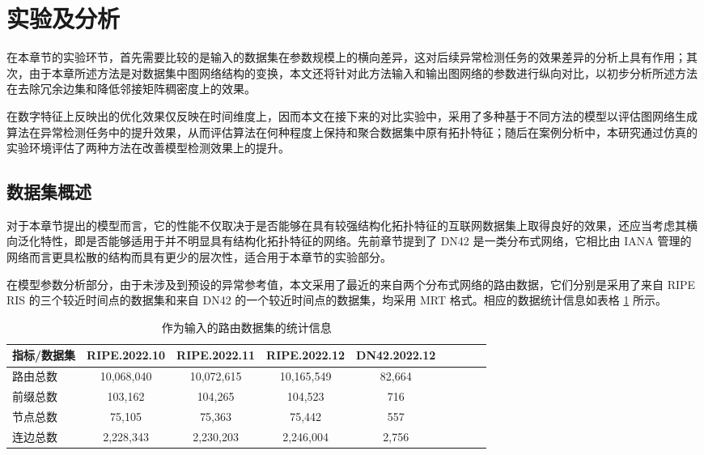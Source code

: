 \section{实验及分析}

在本章节的实验环节，首先需要比较的是输入的数据集在参数规模上的横向差异，这对后续异常检测任务的效果差异的分析上具有作用；其次，由于本章所述方法是对数据集中图网络结构的变换，本文还将针对此方法输入和输出图网络的参数进行纵向对比，以初步分析所述方法在去除冗余边集和降低邻接矩阵稠密度上的效果。

在数字特征上反映出的优化效果仅反映在时间维度上，因而本文在接下来的对比实验中，采用了多种基于不同方法的模型以评估图网络生成算法在异常检测任务中的提升效果，从而评估算法在何种程度上保持和聚合数据集中原有拓扑特征；随后在案例分析中，本研究通过仿真的实验环境评估了两种方法在改善模型检测效果上的提升。

\subsection{数据集概述}

对于本章节提出的模型而言，它的性能不仅取决于是否能够在具有较强结构化拓扑特征的互联网数据集上取得良好的效果，还应当考虑其横向泛化特性，即是否能够适用于并不明显具有结构化拓扑特征的网络。先前章节提到了 DN42 是一类分布式网络，它相比由 IANA 管理的网络而言更具松散的结构而具有更少的层次性，适合用于本章节的实验部分。

在模型参数分析部分，由于未涉及到预设的异常参考值，本文采用了最近的来自两个分布式网络的路由数据，它们分别是采用了来自 RIPE RIS 的三个较近时间点的数据集和来自 DN42 的一个较近时间点的数据集，均采用 MRT 格式。相应的数据统计信息如表格 \ref{c3_data_input} 所示。

\begin{table}
    \caption{作为输入的路由数据集的统计信息}
    \begin{tabular}{lcccccccc}
        \toprule
        指标/数据集 & RIPE.2022.10 & RIPE.2022.11 & RIPE.2022.12 & DN42.2022.12 \\
        \midrule
        路由总数   & 10,068,040   & 10,072,615   & 10,165,549   & 82,664       \\
        前缀总数   & 103,162      & 104,265      & 104,523      & 716          \\
        \midrule
        节点总数   & 75,105       & 75,363       & 75,442       & 557          \\
        连边总数   & 2,228,343    & 2,230,203    & 2,246,004    & 2,756        \\
        \bottomrule
    \end{tabular}
    \label{c3_data_input}
\end{table}

